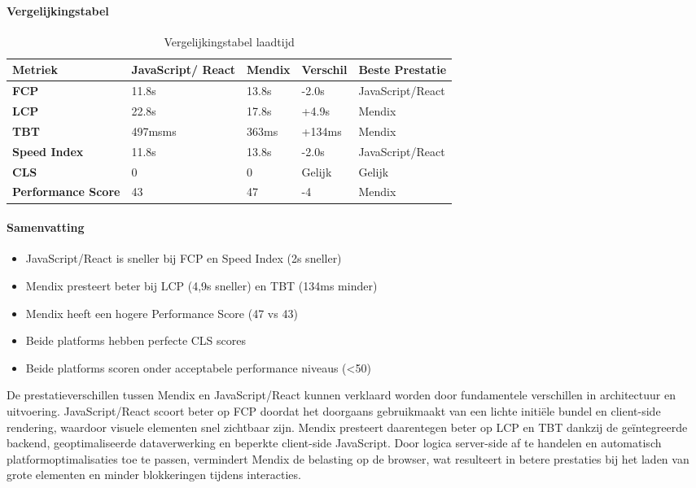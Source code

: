 \paragraph{Vergelijkingstabel}
\begin{table}[h]
    \centering
    \begin{tabular}{ |p{3cm}|p{2.25cm}|p{2.25cm}|p{2.25cm}|p{3.25cm}|}
        \hline
        \textbf{Metriek} & \textbf{JavaScript/} \newline \textbf{React} & \textbf{Mendix}  & \textbf{Verschil} & \textbf{Beste Prestatie}\\
        \hline
        \textbf{\gls{FCP}}  & 11.8s & 13.8s & -2.0s & JavaScript/React \\
        \hline
        \textbf{\gls{LCP}} & 22.8s & 17.8s & +4.9s & Mendix\\
        \hline
        \textbf{\gls{TBT}}  & 497msms & 363ms & +134ms & Mendix \\
        \hline
        \textbf{Speed Index}  & 11.8s & 13.8s & -2.0s & JavaScript/React \\
        \hline
        \textbf{\gls{CLS}}  & 0 & 0  & Gelijk & Gelijk \\
        \hline
        \textbf{Performance Score}  & 43 & 47  & -4 & Mendix \\
        \hline
    \end{tabular}
    \caption[\centering Vergelijkingstabel laadtijd]{\label{tab:Vergelijkingstabel laadtijd}Vergelijkingstabel laadtijd}
\end{table}

\paragraph{Samenvatting}
\begin{itemize}
    \item JavaScript/React is sneller bij \gls{FCP} en Speed Index (2s sneller)
    \item Mendix presteert beter bij \gls{LCP} (4,9s sneller) en \gls{TBT} (134ms minder)
    \item Mendix heeft een hogere Performance Score (47 vs 43)
    \item Beide platforms hebben perfecte \gls{CLS} scores
    \item Beide platforms scoren onder acceptabele performance niveaus (<50)
\end{itemize}
De prestatieverschillen tussen Mendix en JavaScript/React kunnen verklaard worden door fundamentele verschillen in architectuur en uitvoering. JavaScript/React scoort beter op \gls{FCP} doordat het doorgaans gebruikmaakt van een lichte initiële bundel en client-side rendering, waardoor visuele elementen snel zichtbaar zijn. Mendix presteert daarentegen beter op \gls{LCP} en \gls{TBT} dankzij de geïntegreerde backend, geoptimaliseerde dataverwerking en beperkte client-side JavaScript. Door logica server-side af te handelen en automatisch platformoptimalisaties toe te passen, vermindert Mendix de belasting op de browser, wat resulteert in betere prestaties bij het laden van grote elementen en minder blokkeringen tijdens interacties.

